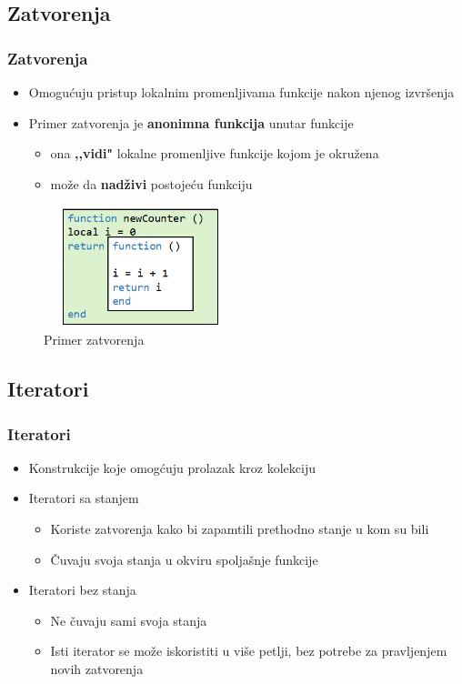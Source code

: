 \documentclass{beamer}
\begin{document}
\subsection{Zatvorenja}
\begin{frame}
\frametitle{Zatvorenja}
\begin{itemize}
\item Omogućuju pristup lokalnim promenljivama funkcije nakon njenog izvršenja
\item Primer zatvorenja je \textbf{anonimna funkcija} unutar funkcije
\begin{itemize}
\item ona \textbf{,,vidi"} lokalne promenljive funkcije kojom je okružena
\item može da \textbf{nadživi} postojeću funkciju
\end{itemize}
\end{itemize}

\begin{figure}
\includegraphics[scale=2.98, width=160pt, height=100pt]{zatvorenje.png}
\caption{Primer zatvorenja}
\end{figure}


\end{frame}




\subsection{Iteratori}
\begin{frame}
\frametitle{Iteratori}

\begin{itemize}
\item Konstrukcije koje omogćuju prolazak kroz kolekciju
\item Iteratori sa stanjem
\begin{itemize}
\item Koriste zatvorenja kako bi zapamtili prethodno stanje u kom su bili
\item Čuvaju svoja stanja u okviru spoljašnje funkcije
\end{itemize}
\item Iteratori bez stanja
\begin{itemize}
\item Ne čuvaju sami svoja stanja
\item Isti iterator se može iskoristiti u više petlji, bez potrebe za pravljenjem novih zatvorenja
\end{itemize}
\end{itemize}

\end{frame}
\end{document}
